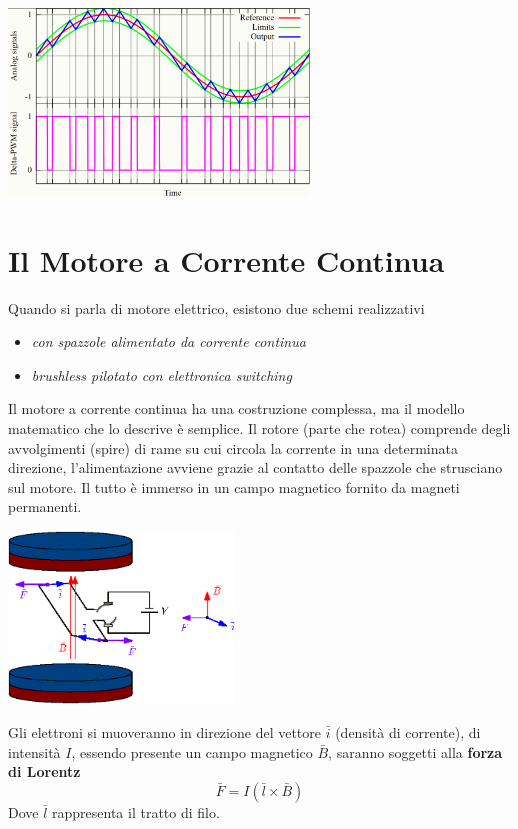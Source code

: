 \documentclass[10pt, letterpaper]{report}
\begin{document}
\begin{center}
    \includegraphics[width=0.6\textwidth ]{images/DeltaPWM.png}
\end{center}
\flowerLine 
\section{Il Motore a Corrente Continua}
Quando si parla di motore elettrico, esistono due schemi realizzativi\begin{itemize}
    \item \textit{con spazzole alimentato da corrente continua} 
    \item \textit{brushless pilotato con elettronica switching}
\end{itemize}
Il motore a corrente continua ha una costruzione complessa, ma il modello matematico che lo descrive è semplice. Il rotore (parte che rotea) comprende degli avvolgimenti (spire) di rame su cui circola la corrente in una determinata direzione, l'alimentazione avviene grazie al contatto delle spazzole che strusciano sul motore. Il tutto è immerso in un campo magnetico fornito da magneti permanenti.\begin{center}
    \includegraphics[width=0.45\textwidth ]{images/motore2.eps}
\end{center}
Gli elettroni si muoveranno in direzione del vettore $\bar i$ (densità di corrente), di intensità $I$, essendo presente un campo magnetico $\bar B$, saranno soggetti alla \textbf{forza di Lorentz} 
$$ \bar F = I(\bar l \times \bar B)$$
Dove $\bar l$ rappresenta il tratto di filo.
\end{document}
